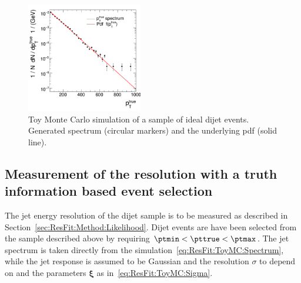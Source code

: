 \begin{figure}[ht]
  \centering
  \includegraphics[width=0.45\textwidth]{figures/resFit_ToyMC_PtGenCuts_SpectrumLog}
  \caption{Toy Monte Carlo simulation of a sample of ideal dijet events.
    Generated \pttrue spectrum (circular markers) and the underlying pdf (solid line).}
  \label{fig:ResFit:ToyMC:Sample:Spectrum}
\end{figure}


\subsection{Measurement of the resolution with a truth information based event selection}\label{sec:ResFit:ToyMC:PtGenCuts}

The jet energy resolution of the dijet sample is to be measured as described in Section~\ref{sec:ResFit:Method:Likelihood}.
Dijet events are have been selected from the sample described above by
requiring \mbox{$\ptmin < \pttrue < \ptmax$}.
The jet \pt spectrum is taken directly from the
simulation~\eqref{eq:ResFit:ToyMC:Spectrum}, while the jet \pt
response is assumed to be Gaussian and the resolution $\sigma$ to
depend on \pttrue and the parameters $\mathbf{\xi}$ as
in~\eqref{eq:ResFit:ToyMC:Sigma}.


